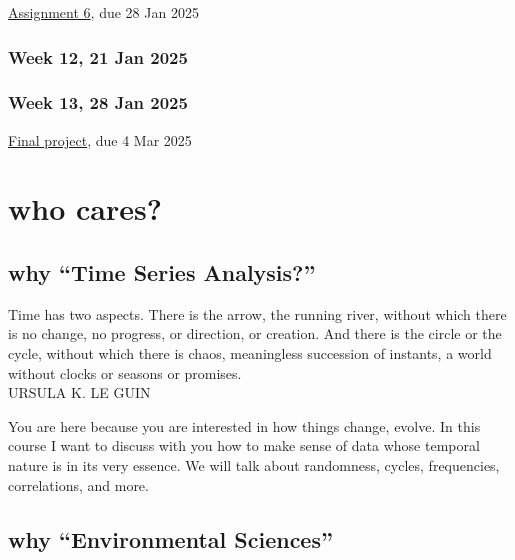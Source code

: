 \documentclass[
  letterpaper,
  DIV=11,
  numbers=noendperiod]{scrreprt}
\begin{document}
\href{assignments/assignment6}{Assignment 6}, due 28 Jan 2025

\subsection*{Week 12, 21 Jan 2025}\label{week-12-21-jan-2025}

\subsection*{Week 13, 28 Jan 2025}\label{week-13-28-jan-2025}

\href{assignments/final-project}{Final project}, due 4 Mar 2025


\chapter*{who cares?}\label{who-cares}


\section*{why ``Time Series Analysis?''}\label{why-time-series-analysis}


Time has two aspects. There is the arrow, the running river, without
which there is no change, no progress, or direction, or creation. And
there is the circle or the cycle, without which there is chaos,
meaningless succession of instants, a world without clocks or seasons or
promises.\\
URSULA K. LE GUIN

You are here because you are interested in how things change, evolve. In
this course I want to discuss with you how to make sense of data whose
temporal nature is in its very essence. We will talk about randomness,
cycles, frequencies, correlations, and more.

\section*{why ``Environmental
Sciences''}\label{why-environmental-sciences}
\end{document}
